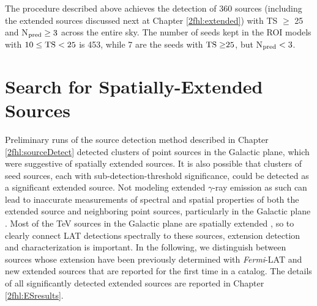 The procedure described above achieves the detection of 360 sources (including
the extended sources discussed next at Chapter \ref{2fhl:extended}) 
with TS $\geq$ 25 and N$_{\rm pred}\geq3$ across the entire sky.
The number of seeds kept in the ROI models
with $10\leq{\rm TS}<25$ is 453, while 7 are the seeds with ${\rm TS\geq}25$, but N$_{\rm pred}<3$.

%
%
\section{Search for Spatially-Extended Sources}
\label{sec:extended}


Preliminary runs of the source detection method described in Chapter \ref{2fhl:sourceDetect} detected clusters of point sources in the Galactic plane, which were suggestive of spatially extended sources. It is also possible that clusters of seed sources, each with sub-detection-threshold significance, could be detected as a significant extended source. 
Not modeling extended $\gamma$-ray emission as such can lead to inaccurate measurements of spectral and spatial properties of both the extended source and neighboring point sources, particularly in the Galactic plane \citep{Lande12}. Most of the TeV sources in the Galactic plane are spatially
extended  \citep{carrigan2013, ong2013}, 
so to clearly connect LAT detections spectrally to these sources, extension detection and characterization is important.
In the following, we distinguish between sources whose extension
have been previously determined with {\it Fermi}-LAT and
new extended sources that are reported for the first time
in a \lat{} catalog. The details of all significantly
detected extended sources are reported  in Chapter \ref{2fhl:ESresults}. 

%
%

